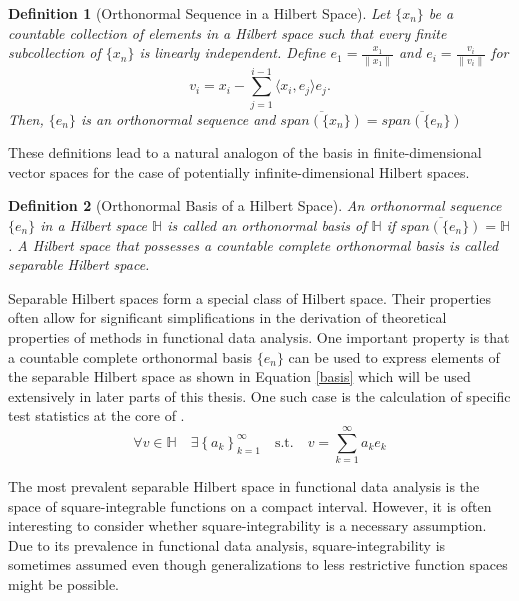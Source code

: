 \documentclass[12pt, a4paper]{article}
\theoremstyle{MAstyle} \newtheorem{assumption}{Assumption}[section]
\theoremstyle{MAstyle} \newtheorem{definition}{Definition}[section]
\theoremstyle{MAstyle} \newtheorem{theorem}{Theorem}[section]
\begin{document}
			\begin{definition}[Orthonormal Sequence in a Hilbert Space]
				Let $\{x_n\}$ be a countable collection of elements in a Hilbert space such that every finite subcollection of $\{x_n\}$ is linearly independent. Define $e_1 = \frac{x_1}{\| x_1 \|}$ and $e_i = \frac{v_i}{\| v_i \|}$ for 
				$$v_i = x_i - \sum_{j = 1}^{i - 1}\langle x_i, e_j\rangle e_j.$$
				Then, $\{e_n\}$ is an orthonormal sequence and $\overline{{\textit{span}\left(\{x_n\}\right)}} = \overline{{\textit{span}\left(\{e_n\}\right)}}$
			\end{definition}
			These definitions lead to a natural analogon of the basis in finite-dimensional vector spaces for the case of potentially infinite-dimensional Hilbert spaces.
			\begin{definition}[Orthonormal Basis of a Hilbert Space]
				An orthonormal sequence $\{e_n\}$ in a Hilbert space $\mathbb{H}$ is called an orthonormal basis of $\mathbb{H}$ if $\overline{{\textit{span}\left(\{e_n\}\right)}} = \mathbb{H}$. 
				A Hilbert space that possesses a countable complete orthonormal basis is called separable Hilbert space.
			\end{definition}
			
			Separable Hilbert spaces form a special class of Hilbert space. Their properties often allow for significant simplifications in the derivation of theoretical properties of methods in functional data analysis. 
			One important property is that a countable complete orthonormal basis $\{e_n\}$ can be used to express elements of the separable Hilbert space as shown in Equation \ref{basis} which will be used extensively in later parts of this thesis.
			One such case is the calculation of specific test statistics at the core of \cite{bugni_permutation_2021}. 
			\begin{equation}\label{basis}
				\forall v \in \mathbb{H} \quad \exists \left\{a_k\right\}_{k = 1}^{\infty} \quad \text{s.t.} \quad v = \sum_{k = 1}^{\infty} a_k e_k
			\end{equation}
			
			The most prevalent separable Hilbert space in functional data analysis is the space of square-integrable functions on a compact interval. However, it is often interesting to consider whether square-integrability is a necessary assumption. Due to its prevalence in functional data analysis, square-integrability is sometimes assumed even though generalizations to less restrictive function spaces might be possible.
			
\end{document}
